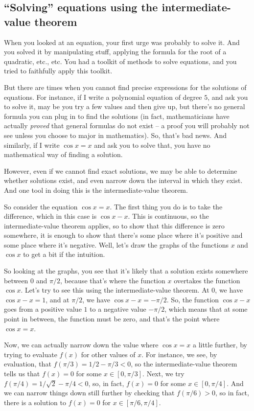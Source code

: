 \documentclass[10pt]{amsart}
\begin{document}
\subsection{``Solving'' equations using the intermediate-value theorem}

When you looked at an equation, your first urge was
probably to solve it. And you solved it by manipulating stuff,
applying the formula for the root of a quadratic, etc., etc. You had a
toolkit of methods to solve equations, and you tried to faithfully
apply this toolkit.

But there are times when you cannot find precise expressions for the
solutions of equations. For instance, if I write a polynomial equation
of degree $5$, and ask you to solve it, may be you try a few values
and then give up, but there's no general formula you can plug in to
find the solutions (in fact, mathematicians have actually {\em proved}
that general formulas do not exist -- a proof you will probably not
see unless you choose to major in mathematics). So, that's bad
news. And similarly, if I write $\cos x = x$ and ask you to solve
that, you have no mathematical way of finding a solution.

However, even if we cannot find exact solutions, we may be able to
determine whether solutions exist, and even narrow down the interval in
which they exist. And one tool in doing this is the intermediate-value
theorem.

So consider the equation $\cos x = x$. The first thing you do is to
take the difference, which in this case is $\cos x - x$. This is
continuous, so the intermediate-value theorem applies, so to show that
this difference is zero somewhere, it is enough to show that there's
some place where it's positive and some place where it's
negative. Well, let's draw the graphs of the functions $x$ and $\cos
x$ to get a bit if the intuition.

So looking at the graphs, you see that it's likely that a solution
exists somewhere between $0$ and $\pi/2$, because that's where the
function $x$ overtakes the function $\cos x$. Let's try to see this
using the intermediate-value theorem. At $0$, we have $\cos x - x =
1$, and at $\pi/2$, we have $\cos x - x = -\pi/2$. So, the function
$\cos x - x$ goes from a positive value $1$ to a negative value
$-\pi/2$, which means that at some point in between, the function must
be zero, and that's the point where $\cos x = x$.

Now, we can actually narrow down the value where $\cos x = x$ a little
further, by trying to evaluate $f(x)$ for other values of $x$. For
instance, we see, by evaluation, that $f(\pi/3) = 1/2 - \pi/3 < 0$, so
the intermediate-value theorem tells us that $f(x) = 0$ for some $x
\in [0,\pi/3]$. Next, we try $f(\pi/4) = 1/\sqrt{2} - \pi/4 < 0$, so,
in fact, $f(x) = 0$ for some $x \in [0,\pi/4]$. And we can narrow
things down still further by checking that $f(\pi/6) > 0$, so in fact,
there is a solution to $f(x) = 0$ for $x \in [\pi/6,\pi/4]$.
\end{document}
